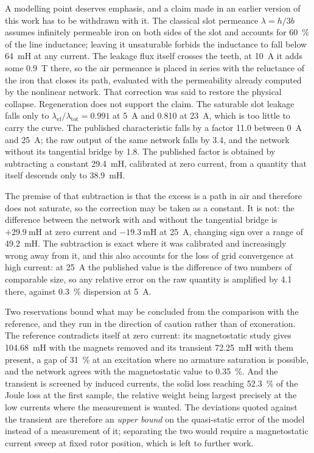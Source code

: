 \documentclass[10pt,a4paper,twocolumn]{article}
\theoremstyle{plain}
\theoremstyle{remark}
\begin{document}
A modelling point deserves emphasis, and a claim made in an earlier
version of this work has to be withdrawn with it. The classical slot
permeance $\lambda=h/3b$ assumes infinitely permeable iron on both sides
of the slot and accounts for \SI{60}{\percent} of the line inductance;
leaving it unsaturable forbids the inductance to fall below
\SI{64}{\milli\henry} at any current. The leakage flux itself crosses
the teeth, at \SI{10}{\ampere} it adds some \SI{0.9}{\tesla} there, so
the air permeance is placed in series with the reluctance of the iron
that closes its path, evaluated with the permeability already computed
by the nonlinear network. That correction was said to restore the
physical collapse. Regeneration does not support the claim. The
saturable slot leakage falls only to $\lambda_{\mathrm{ef}}/\lambda_{\mathrm{tot}}
=\num{0.991}$ at \SI{5}{\ampere} and \num{0.810} at \SI{23}{\ampere},
which is too little to carry the curve. The published characteristic
falls by a factor \num{11.0} between \SI{0}{\ampere} and
\SI{25}{\ampere}; the raw output of the same network falls by
\num{3.4}, and the network without its tangential bridge by \num{1.8}.
The published factor is obtained by subtracting a constant
\SI{29.4}{\milli\henry}, calibrated at zero current, from a quantity
that itself descends only to \SI{38.9}{\milli\henry}.

The premise of that subtraction is that the excess is a path in air and
therefore does not saturate, so the correction may be taken as a
constant. It is not: the difference between the network with and without
the tangential bridge is $+\SI{29.9}{\milli\henry}$ at zero current and
$-\SI{19.3}{\milli\henry}$ at \SI{25}{\ampere}, changing sign over a
range of \SI{49.2}{\milli\henry}. The subtraction is exact where it was
calibrated and increasingly wrong away from it, and this also accounts
for the loss of grid convergence at high current: at \SI{25}{\ampere}
the published value is the difference of two numbers of comparable size,
so any relative error on the raw quantity is amplified by \num{4.1}
there, against \SI{0.3}{\percent} dispersion at \SI{5}{\ampere}.

Two reservations bound what may be concluded from the comparison with
the reference, and they run in the direction of caution rather than
of exoneration. The reference contradicts itself at zero current:
its magnetostatic study gives \SI{104.68}{\milli\henry} with the magnets
removed and its transient \SI{72.25}{\milli\henry} with them present, a
gap of \SI{31}{\percent} at an excitation where no armature saturation
is possible, and the network agrees with the magnetostatic value to
\SI{0.35}{\percent}. And the transient is screened by induced currents,
the solid loss reaching \SI{52.3}{\percent} of the Joule loss at the
first sample, the relative weight being largest precisely at the low
currents where the measurement is wanted. The deviations quoted against
the transient are therefore an \emph{upper bound} on the quasi-static
error of the model instead of a measurement of it; separating the two
would require a magnetostatic current sweep at fixed rotor position,
which is left to further work.
\end{document}
